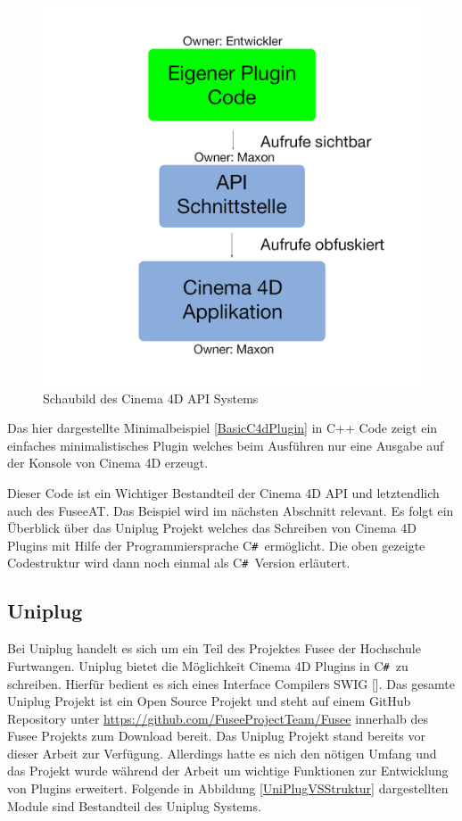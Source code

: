 \documentclass[pagesize, paper=a4, fontsize=12pt, titlepage=true, headings=small, headnosepline, abstractoff, liststotoc, nochapterprefix, plainheadsepline, twoside]{scrreprt}
\newcommand{\CSS}{C\texttt{\# }}
\begin{document}
\begin{figure}[ht]
	\centering
  \includegraphics[width=\linewidth]{Bilder/C4D_Api_Schaubild_v1.jpg}
	\caption{Schaubild des Cinema 4D API Systems}
	\label{C4D API Schaubild}
\end{figure}

Das hier dargestellte Minimalbeispiel \ref{BasicC4dPlugin} in C++ Code zeigt ein einfaches minimalistisches Plugin welches beim Ausführen nur eine Ausgabe auf der Konsole von Cinema 4D erzeugt.

\newpage

Dieser Code ist ein Wichtiger Bestandteil der Cinema 4D API und letztendlich auch des FuseeAT. Das Beispiel wird im nächsten Abschnitt relevant. Es folgt ein Überblick über das Uniplug Projekt welches das Schreiben von Cinema 4D Plugins mit Hilfe der Programmiersprache \CSS ermöglicht. Die oben gezeigte  Codestruktur wird dann noch einmal als \CSS Version erläutert.

\subsection{Uniplug}
Bei Uniplug handelt es sich um ein Teil des Projektes Fusee der Hochschule Furtwangen. Uniplug bietet die Möglichkeit Cinema 4D Plugins in \CSS zu schreiben. Hierfür bedient es sich eines Interface Compilers SWIG []. Das gesamte Uniplug Projekt ist ein Open Source Projekt und steht auf einem GitHub Repository unter \url{https://github.com/FuseeProjectTeam/Fusee} innerhalb des Fusee Projekts zum Download bereit. Das Uniplug Projekt stand bereits vor dieser Arbeit zur Verfügung. Allerdings hatte es nich den nötigen Umfang und das Projekt wurde während der Arbeit um wichtige Funktionen zur Entwicklung von Plugins erweitert. Folgende in Abbildung \ref{UniPlugVSStruktur} dargestellten Module sind Bestandteil des Uniplug Systems.
\end{document}

